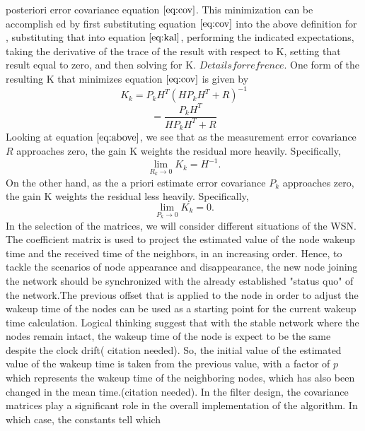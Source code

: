 \documentclass[a4paper,8pt]{report}
\begin{document}
posteriori error covariance equation $\ref{eq:cov}$. This
minimization can be accomplish ed by first substituting equation
$\ref{eq:cov}$ into the above definition for , substituting that
into equation $\ref{eq:kal}$, performing the indicated expectations,
taking the derivative of the trace of the result with respect to K,
setting that result equal to zero, and then solving for K. $Details
for refrence$. One form of the resulting K that minimizes equation
$\ref{eq:cov}$ is given by
\begin{equation}
K_k = P_kH^{T}(HP_kH^{T} + R)^{-1}\end{equation}\begin{equation}
    = \frac{P_kH^T}{HP_kH^T + R}
\end{equation}
Looking at equation $\ref{eq:above}$, we see that as the measurement
error covariance $R$ approaches zero, the gain K weights the
residual more heavily. Specifically,
\begin{equation}
\mathop {\lim }\limits_{R_k \to 0 } {K_k} = H^{-1}.
\end{equation}
On the other hand, as the a priori estimate error covariance $P_k$
approaches zero, the gain K weights the residual less heavily.
Specifically,
\begin{equation}
\mathop {\lim }\limits_{P_k \to 0 } {K_k} = 0.
\end{equation}
In the selection of the matrices, we will consider different
situations of the WSN. The coefficient matrix is used to project the
estimated value of the node wakeup time and the received time of the
neighbors, in an increasing order. Hence, to tackle the scenarios of
node appearance and disappearance, the new node joining the network
should be synchronized with the already established "status quo" of
the network.\newline The previous offset that is applied to the node
in order to adjust the wakeup time of the nodes can be used as a
starting point for the current wakeup time calculation. Logical
thinking suggest that with the stable network where the nodes remain
intact, the wakeup time of the node is expect to be the same despite
the clock drift( citation needed). So, the initial value of the
estimated value of the wakeup time is taken from the previous value,
with a factor of $p$ which represents the wakeup time of the
neighboring nodes, which has also been changed in the mean
time.(citation needed).
In the filter design, the covariance matrices play a significant role in the
overall implementation of the algorithm. In which case, the constants tell which
\end{document}
